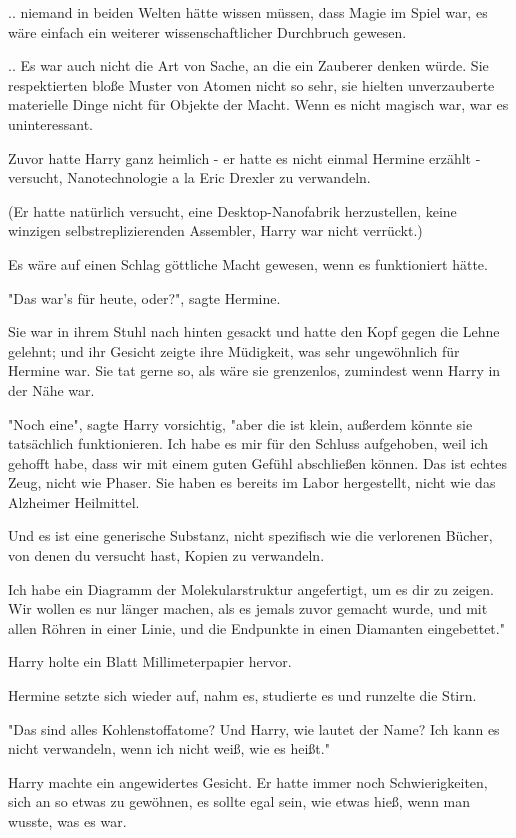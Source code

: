 {.. niemand in beiden Welten hätte wissen müssen, dass Magie im Spiel war, es wäre einfach ein weiterer wissenschaftlicher Durchbruch gewesen.

.. Es war auch nicht die Art von Sache, an die ein Zauberer denken würde. Sie respektierten bloße Muster von Atomen nicht so sehr, sie hielten unverzauberte materielle Dinge nicht für Objekte der Macht. Wenn es nicht magisch war, war es uninteressant.

Zuvor hatte Harry ganz heimlich - er hatte es nicht einmal Hermine erzählt - versucht, Nanotechnologie a la Eric Drexler zu verwandeln.

(Er hatte natürlich versucht, eine Desktop-Nanofabrik herzustellen, keine winzigen selbstreplizierenden Assembler, Harry war nicht verrückt.)

Es wäre auf einen Schlag göttliche Macht gewesen, wenn es funktioniert hätte.

"Das war's für heute, oder?", sagte Hermine.

Sie war in ihrem Stuhl nach hinten gesackt und hatte den Kopf gegen die Lehne gelehnt; und ihr Gesicht zeigte ihre Müdigkeit, was sehr ungewöhnlich für Hermine war. Sie tat gerne so, als wäre sie grenzenlos, zumindest wenn Harry in der Nähe war.

"Noch eine", sagte Harry vorsichtig, "aber die ist klein, außerdem könnte sie tatsächlich funktionieren. Ich habe es mir für den Schluss aufgehoben, weil ich gehofft habe, dass wir mit einem guten Gefühl abschließen können. Das ist echtes Zeug, nicht wie Phaser. Sie haben es bereits im Labor hergestellt, nicht wie das Alzheimer Heilmittel.

Und es ist eine generische Substanz, nicht spezifisch wie die verlorenen Bücher, von denen du versucht hast, Kopien zu verwandeln.

Ich habe ein Diagramm der Molekularstruktur angefertigt, um es dir zu zeigen. Wir wollen es nur länger machen, als es jemals zuvor gemacht wurde, und mit allen Röhren in einer Linie, und die Endpunkte in einen Diamanten eingebettet."

Harry holte ein Blatt Millimeterpapier hervor.

Hermine setzte sich wieder auf, nahm es, studierte es und runzelte die Stirn.

"Das sind alles Kohlenstoffatome? Und Harry, wie lautet der Name? Ich kann es nicht verwandeln, wenn ich nicht weiß, wie es heißt."

Harry machte ein angewidertes Gesicht. Er hatte immer noch Schwierigkeiten, sich an so etwas zu gewöhnen, es sollte egal sein, wie etwas hieß, wenn man wusste, was es war.

}
